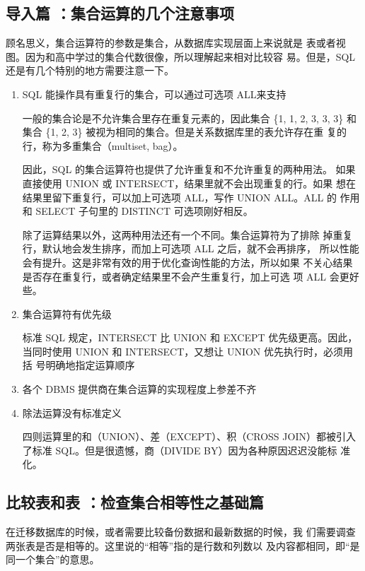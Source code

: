 \subsection{导入篇 ：集合运算的几个注意事项\label{intro17}}
顾名思义，集合运算符的参数是集合，从数据库实现层面上来说就是
表或者视图。因为和高中学过的集合代数很像，所以理解起来相对比较容
易。但是，SQL 还是有几个特别的地方需要注意一下。


\begin{enumerate}
      \item SQL 能操作具有重复行的集合，可以通过可选项 ALL来支持

            一般的集合论是不允许集合里存在重复元素的，因此集合 \{1, 1, 2, 3, 3,
            3\} 和集合 \{1, 2, 3\} 被视为相同的集合。但是关系数据库里的表允许存在重
            复的行，称为多重集合（multiset, bag）。

            因此，SQL 的集合运算符也提供了允许重复和不允许重复的两种用法。
            如果直接使用 UNION 或 INTERSECT，结果里就不会出现重复的行。如果
            想在结果里留下重复行，可以加上可选项 ALL，写作 UNION ALL。ALL 的
            作用和 SELECT 子句里的 DISTINCT 可选项刚好相反。

            除了运算结果以外，这两种用法还有一个不同。集合运算符为了排除
            掉重复行，默认地会发生排序，而加上可选项 ALL 之后，就不会再排序，
            所以性能会有提升。这是非常有效的用于优化查询性能的方法，所以如果
            不关心结果是否存在重复行，或者确定结果里不会产生重复行，加上可选
            项 ALL 会更好些。
      \item 集合运算符有优先级

            标准 SQL 规定，INTERSECT 比 UNION 和 EXCEPT 优先级更高。因此，
            当同时使用 UNION 和 INTERSECT，又想让 UNION 优先执行时，必须用括
            号明确地指定运算顺序
      \item 各个 DBMS 提供商在集合运算的实现程度上参差不齐
      \item 除法运算没有标准定义

            四则运算里的和（UNION）、差（EXCEPT）、积（CROSS JOIN）都被引入了标准 SQL。但是很遗憾，商（DIVIDE BY）因为各种原因迟迟没能标
            准化。
\end{enumerate}

\subsection{比较表和表 ：检查集合相等性之基础篇}
在迁移数据库的时候，或者需要比较备份数据和最新数据的时候，我
们需要调查两张表是否是相等的。这里说的“相等”指的是行数和列数以
及内容都相同，即“是同一个集合”的意思。

